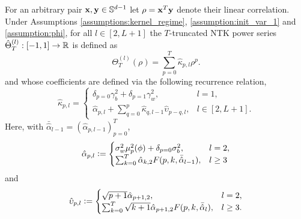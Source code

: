\begin{definition} \label{def:truncated_ntk}
    For an arbitrary pair $\mathbf x, \mathbf y \in \mathbb{S}^{d-1}$ let $\rho = \mathbf x^T\mathbf y$ denote their linear correlation. Under Assumptions \ref{assumptions:kernel_regime}, \ref{assumption:init_var_1} and \ref{assumption:phi}, for all $l \in [2, L+1]$ the $T$-truncated NTK power series $\hat{\Theta}_{T}^{(l)}:[-1,1]\rightarrow \mathbb{R}$ is defined as
    \begin{equation}
        \Theta_T^{(l)}(\rho) = \sum_{p=0}^T \hat{\kappa}_{p,l} \rho^p.
    \end{equation}
    and whose coefficients are defined via the following recurrence relation,
    \begin{equation}
        \hat{\kappa}_{p,l} = 
        \begin{cases}
            \delta_{p=0}\gamma_b^2 + \delta_{p=1}\gamma_w^2, & l=1,\\
            \hat{\alpha}_{p,l} + \sum_{q = 0}^p \hat{\kappa}_{q,l-1}\hat{\upsilon}_{p-q,l}, &l \in [2,L+1].
        \end{cases}
    \end{equation}
    Here, with $\bar{\hat{\alpha}}_{l-1} = (\hat{\alpha}_{p,l-1})_{p=0}^T$,
    \begin{equation}
        \hat{\alpha}_{p,l} \vcentcolon= 
        \begin{cases}
            \sigma_w^2 \mu_p^2(\phi) + \delta_{p=0}\sigma_b^2, &l=2,\\
            \sum_{k=0}^{T} \hat{\alpha}_{k,2} F(p,k,\bar{\hat{\alpha}}_{l-1}), &l\geq 3
        \end{cases}
    \end{equation}
    and
    \begin{equation}
        \hat{\upsilon}_{p,l} \vcentcolon= 
        \begin{cases}
            \sqrt{p+1}\hat{\alpha}_{p+1,2}, &l=2,\\
            \sum_{k=0}^{T} \sqrt{k+1} \hat{\alpha}_{p+1,2} F(p,k,\bar{\hat{\alpha}}_{l}), &l\geq 3.
        \end{cases}
    \end{equation}
\end{definition}

